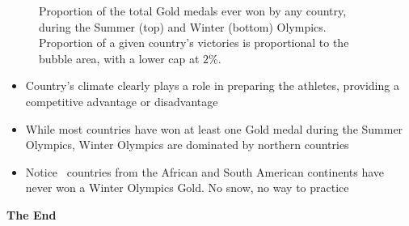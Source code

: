 \documentclass[11pt, a4paper]{report}
\newcommand\inputpgf[2]{{
\let\pgfimageWithoutPath\pgfimage
\renewcommand{\pgfimage}[2][]{\pgfimageWithoutPath[##1]{#1/##2}}

}} %
\newcommand{\pathnPlan}{/home/vadim/Documents/nplan_olympics/story/}
\newcommand{\pathFigs}{figs} %
\begin{document}
\begin{landscape}
\begin{figure}[!htbp]
	\centering
	\inputpgf{\pathnPlan \pathFigs}{mapsSeason.pgf}
	\caption{Proportion of the total Gold medals ever won by any country, during the Summer (top) and Winter (bottom) Olympics. Proportion of a given country's victories is proportional to the bubble area, with a lower cap at $2\%$.}
\end{figure}
\begin{itemize}
\item Country's climate clearly plays a role in preparing the athletes, providing a competitive advantage or disadvantage
\item While most countries have won at least one Gold medal during the Summer Olympics, Winter Olympics are dominated by northern countries
\item Notice \textendash\ countries from the African and South American continents have never won a Winter Olympics Gold. No snow, no way to practice
\end{itemize}
\end{landscape}

\begin{landscape}
\centerline{\LARGE\textbf{The End}}
\end{landscape}
\end{document}
